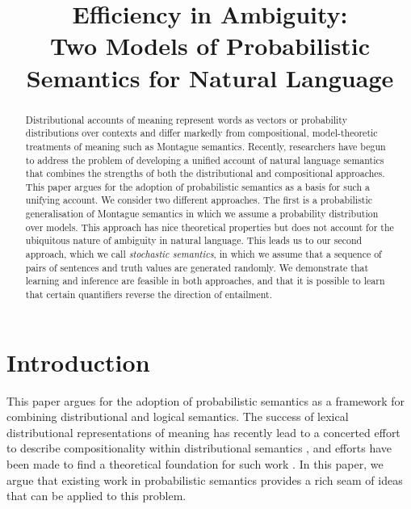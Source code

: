 \documentclass[11pt]{article}
\title{Efficiency in Ambiguity:\\ Two Models of Probabilistic Semantics for Natural Language}
\author{}
\date{}
\theoremstyle{definition}
\begin{document}
\maketitle
\begin{abstract}
  Distributional accounts of meaning represent words as vectors or
  probability distributions over contexts and differ markedly from
  compositional, model-theoretic treatments of meaning such as
  Montague semantics. Recently, researchers have begun to address the
  problem of developing a unified account of natural language
  semantics that combines the strengths of both the distributional and
  compositional approaches. This paper argues for the adoption of
  probabilistic semantics as a basis for such a unifying account. We
  consider two different approaches. The first is a probabilistic
  generalisation of Montague semantics in which we assume a
  probability distribution over models. This approach has nice
  theoretical properties but does not account for the ubiquitous
  nature of ambiguity in natural language. This leads us to our second
  approach, which we call \emph{stochastic semantics}, in which we
  assume that a sequence of pairs of sentences and truth values are
  generated randomly. We demonstrate that learning and inference are
  feasible in both approaches, and that it is possible to learn that
  certain quantifiers reverse the direction of entailment.
\end{abstract}


\section{Introduction}

This paper argues for the adoption of probabilistic semantics as a
framework for combining distributional and logical semantics. The
success of lexical distributional representations of meaning has
recently lead to a concerted effort to describe compositionality
within distributional semantics
\cite{Widdows:08,Mitchell:08,Baroni2010,Garrette:11,Grefenstette:11,Socher:12,Lewis:13},
and efforts have been made to find a theoretical foundation for such
work \cite{Clarke:12,Kartsaklis:14}. In this paper, we argue that
existing work in probabilistic semantics
\cite{Gaifman:64,Nilsson:86,Sato:95} provides a rich seam of ideas
that can be applied to this problem.
\end{document}
